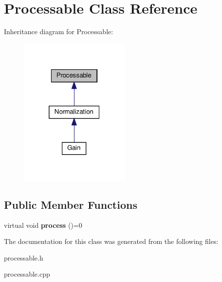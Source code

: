 \hypertarget{classProcessable}{}\section{Processable Class Reference}
\label{classProcessable}


Inheritance diagram for Processable\+:
\nopagebreak
\begin{figure}[H]
\begin{center}
\leavevmode
\includegraphics[width=157pt]{da/d78/classProcessable__inherit__graph}
\end{center}
\end{figure}
\subsection*{Public Member Functions}
\begin{DoxyCompactItemize}
\item 
\mbox{\label{classProcessable_a56c36f88f509d6030d06d58f6bf9d8df}} 
virtual void {\bfseries process} ()=0
\end{DoxyCompactItemize}


The documentation for this class was generated from the following files\+:\begin{DoxyCompactItemize}
\item 
processable.\+h\item 
processable.\+cpp\end{DoxyCompactItemize}
